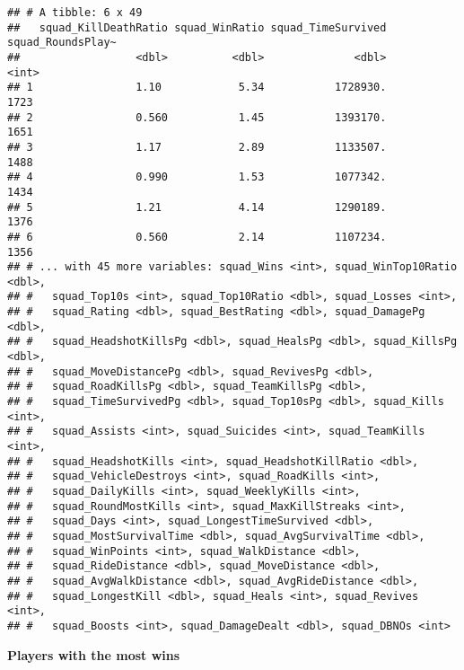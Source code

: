 \documentclass[]{article}
\begin{document}
\begin{verbatim}
## # A tibble: 6 x 49
##   squad_KillDeathRatio squad_WinRatio squad_TimeSurvived squad_RoundsPlay~
##                  <dbl>          <dbl>              <dbl>             <int>
## 1                1.10            5.34           1728930.              1723
## 2                0.560           1.45           1393170.              1651
## 3                1.17            2.89           1133507.              1488
## 4                0.990           1.53           1077342.              1434
## 5                1.21            4.14           1290189.              1376
## 6                0.560           2.14           1107234.              1356
## # ... with 45 more variables: squad_Wins <int>, squad_WinTop10Ratio <dbl>,
## #   squad_Top10s <int>, squad_Top10Ratio <dbl>, squad_Losses <int>,
## #   squad_Rating <dbl>, squad_BestRating <dbl>, squad_DamagePg <dbl>,
## #   squad_HeadshotKillsPg <dbl>, squad_HealsPg <dbl>, squad_KillsPg <dbl>,
## #   squad_MoveDistancePg <dbl>, squad_RevivesPg <dbl>,
## #   squad_RoadKillsPg <dbl>, squad_TeamKillsPg <dbl>,
## #   squad_TimeSurvivedPg <dbl>, squad_Top10sPg <dbl>, squad_Kills <int>,
## #   squad_Assists <int>, squad_Suicides <int>, squad_TeamKills <int>,
## #   squad_HeadshotKills <int>, squad_HeadshotKillRatio <dbl>,
## #   squad_VehicleDestroys <int>, squad_RoadKills <int>,
## #   squad_DailyKills <int>, squad_WeeklyKills <int>,
## #   squad_RoundMostKills <int>, squad_MaxKillStreaks <int>,
## #   squad_Days <int>, squad_LongestTimeSurvived <dbl>,
## #   squad_MostSurvivalTime <dbl>, squad_AvgSurvivalTime <dbl>,
## #   squad_WinPoints <int>, squad_WalkDistance <dbl>,
## #   squad_RideDistance <dbl>, squad_MoveDistance <dbl>,
## #   squad_AvgWalkDistance <dbl>, squad_AvgRideDistance <dbl>,
## #   squad_LongestKill <dbl>, squad_Heals <int>, squad_Revives <int>,
## #   squad_Boosts <int>, squad_DamageDealt <dbl>, squad_DBNOs <int>
\end{verbatim}

\textbf{Players with the most wins}
\end{document}
